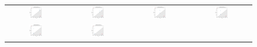 \documentclass[ma]{uncgdissertationexp}
\theoremstyle{plain}
\theoremstyle{definition}
\theoremstyle{remark}
\begin{document}
\begin{figure}[H]
\begin{center}
    \begin{tabular}{cccc}
         \includegraphics[width=0.245\textwidth]{Final Run, (rect prism ring 40 mm cut) persdia.png} &
         \includegraphics[width=0.245\textwidth]{Final Run, (rect prism ring 35 mm cut) persdia.png} &  
         \includegraphics[width=0.245\textwidth]{Final Run, (rect prism ring 30 mm cut) persdia.png} &
         \includegraphics[width=0.245\textwidth]{Final Run, (rect prism ring 25 mm cut) persdia.png} \\ 
         \includegraphics[width=0.245\textwidth]{Final Run, (rect prism ring 20 mm cut) persdia.png} & 
         \includegraphics[width=0.245\textwidth]{Final Run, (rect prism ring 15 mm cut) persdia.png} &

\end{tabular}
\end{center}
\end{figure}
\end{document}
